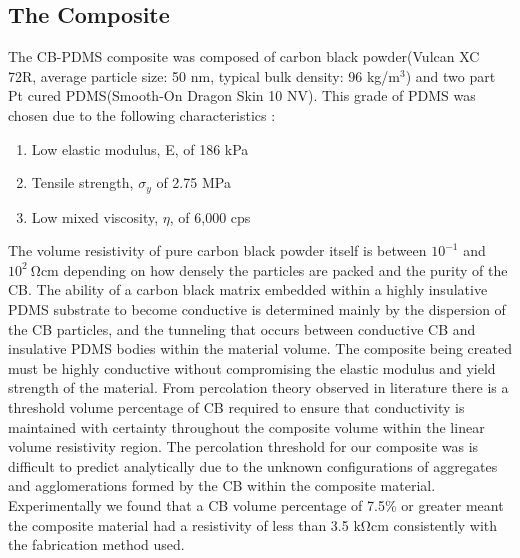 \subsection*{The Composite}
The CB-PDMS composite was composed of carbon black powder(Vulcan XC 72R, average particle size: 50 nm, typical bulk density: 96 kg/m$^3$) and two part Pt cured PDMS(Smooth-On Dragon Skin 10 NV). This grade of PDMS was chosen due to the following characteristics \cite{SmoothOn2021}:
\begin{enumerate}
    \item Low elastic modulus, E, of 186 kPa
    \item Tensile strength, $\sigma_y$ of 2.75 MPa
    \item Low mixed viscosity, $\eta$, of 6,000 cps
\end{enumerate}
The volume resistivity of pure carbon black powder itself is between $10^{-1}$ and $10^2 \ \mathrm{\Omega cm}$ depending on how densely the particles are packed and the purity of the CB\cite{Spahr2017}. The ability of a carbon black matrix embedded within a highly insulative PDMS substrate to become conductive is determined mainly by the dispersion of the CB particles, and the tunneling that occurs between conductive CB and insulative PDMS bodies within the material volume\cite{Spahr2017,Wang2013}. The composite being created must be highly conductive without compromising the elastic modulus and yield strength of the material. From percolation theory observed in literature \cite{Spahr2017} there is a threshold volume percentage of CB required to ensure that conductivity is maintained with certainty throughout the composite volume within the linear volume resistivity region. The percolation threshold for our composite was is difficult to predict analytically due to the unknown configurations of aggregates and agglomerations formed by the CB within the composite material. Experimentally we found that a CB volume percentage of 7.5\% or greater meant the composite material had a resistivity of less than 3.5 $\mathrm{k\Omega cm}$ consistently with the fabrication method used.


